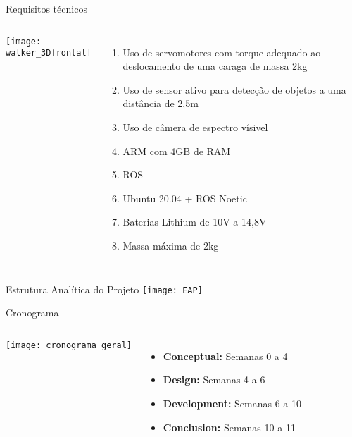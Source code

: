 \begin{frame}[t]{Requisitos técnicos} 
\begin{columns}
        \texttt{[image: walker\_3Dfrontal]}
        \begin{enumerate}
            \item Uso de servomotores com torque adequado ao deslocamento de uma caraga de massa 2kg
            \item Uso de sensor ativo para detecção de objetos a uma distância de 2,5m 
            \item Uso de câmera de espectro vísivel 
            \item ARM com 4GB de RAM
            \item ROS
            \item Ubuntu 20.04 + ROS Noetic
            \item Baterias Lithium de 10V a 14,8V
            \item Massa máxima de 2kg
        \end{enumerate}
\end{columns}

\end{frame}


\begin{frame}[t]{Estrutura Analítica do Projeto} 
    \centering
    \texttt{[image: EAP]}
        
\end{frame}


\begin{frame}[t]{Cronograma} 
    \begin{columns}
            \texttt{[image: cronograma\_geral]}
            \begin{itemize}
                \item \textbf{Conceptual:} Semanas 0 a 4
                \item \textbf{Design:} Semanas 4 a 6
                \item \textbf{Development:} Semanas 6 a 10
                \item \textbf{Conclusion:} Semanas 10 a 11
            \end{itemize}
    \end{columns}
        
\end{frame}


